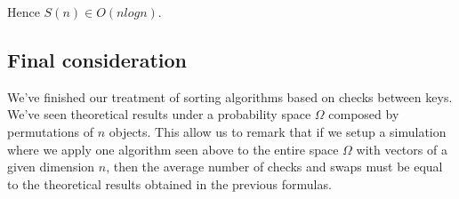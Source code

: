 Hence $S(n) \in O(n logn)$.


\subsection{Final consideration}

We've finished our treatment of sorting algorithms based on checks
between keys. We've seen theoretical results under a probability space
$\Omega$ composed by permutations of $n$ objects. This allow us to
remark that if we setup a simulation where we apply one algorithm seen
above to the entire space $\Omega$ with vectors of a given dimension
$n$, then the average number of checks and swaps must be equal to the
theoretical results obtained in the previous formulas.
